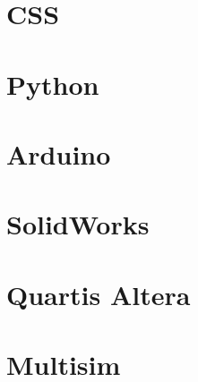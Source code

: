 \documentclass[12pt, letterpaper]{memoir}
\begin{document}
\part{CSS}

\part{Python}

\part{Arduino}


\part{SolidWorks}

\part{Quartis Altera}

\part{Multisim}
\end{document}
